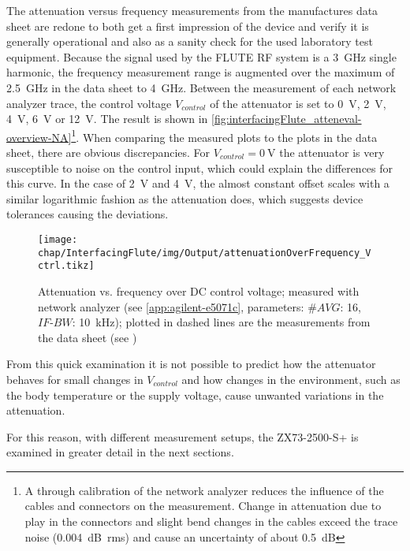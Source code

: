 The attenuation versus frequency measurements from the manufactures data sheet are redone to both get a first impression of the device and verify it is generally operational and also as a sanity check for the used laboratory test equipment.
Because the signal used by the FLUTE RF system is a \SI{3}{\GHz} single harmonic, the frequency measurement range is augmented over the maximum of \SI{2.5}{\GHz} in the data sheet to \SI{4}{\GHz}.
Between the measurement of each network analyzer trace, the control voltage $V_{control}$ of the attenuator is set to \SI{0}{\volt}, \SI{2}{\volt}, \SI{4}{\volt}, \SI{6}{\volt} or \SI{12}{\volt}.
The result is shown in \autoref{fig:interfacingFlute_atteneval-overview-NA}\footnote{A through calibration of the network analyzer reduces the influence of the cables and connectors on the measurement. Change in attenuation due to play in the connectors and slight bend changes in the cables exceed the trace noise (\SI{0.004}{\dB rms}) and cause an uncertainty of about \SI{0.5}{\dB}}.
When comparing the measured plots to the plots in the data sheet, there are obvious discrepancies. For $V_{control}=\SI{0}{\volt}$ the attenuator is very susceptible to noise on the control input, which could explain the differences for this curve. In the case of \SI{2}{\volt} and \SI{4}{\volt}, the almost constant offset scales with a similar logarithmic fashion as the attenuation does, which suggests device tolerances causing the deviations.

\begin{figure}[tb]
	\centering
	\texttt{[image: chap/InterfacingFlute/img/Output/attenuationOverFrequency\_Vctrl.tikz]}
	\caption{Attenuation vs. frequency over DC control voltage; measured with network analyzer (see \ref{app:agilent-e5071c}, parameters: $\#AVG$: 16, $IF\text{-}BW$: \SI{10}{\kHz}); plotted in dashed lines are the measurements from the data sheet (see \cite[p.~2]{mini-circuitsZX732500VoltageVariable})}
	\label{fig:interfacingFlute_atteneval-overview-NA}
\end{figure}

From this quick examination it is not possible to predict how the attenuator behaves for small changes in $V_{control}$ and how changes in the environment, such as the body temperature or the supply voltage, cause unwanted variations in the attenuation. 

For this reason, with different measurement setups, the ZX73-2500-S+ is examined in greater detail in the next sections.

